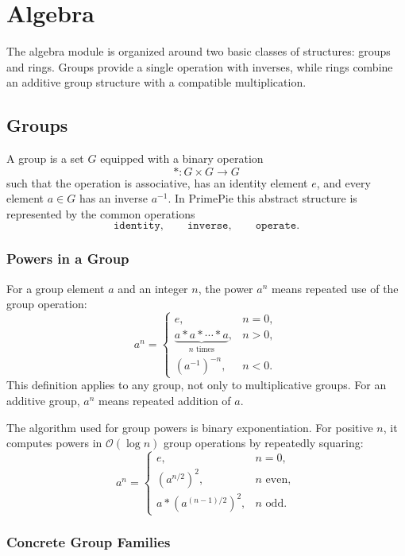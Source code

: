 \chapter{Algebra}
\label{sec:algebra}

The algebra module is organized around two basic classes of structures:
groups and rings. Groups provide a single operation with inverses, while rings
combine an additive group structure with a compatible multiplication.

\section{Groups}

A group is a set $G$ equipped with a binary operation
\[
  \ast : G \times G \to G
\]
such that the operation is associative, has an identity element $e$, and every
element $a \in G$ has an inverse $a^{-1}$. In PrimePie this abstract structure
is represented by the common operations
\[
  \texttt{identity}, \qquad
  \texttt{inverse}, \qquad
  \texttt{operate}.
\]

\subsection*{Powers in a Group}

For a group element $a$ and an integer $n$, the power $a^n$ means repeated use
of the group operation:
\[
a^n =
\begin{cases}
e, & n = 0,\\
\underbrace{a \ast a \ast \cdots \ast a}_{n \text{ times}}, & n > 0,\\
(a^{-1})^{-n}, & n < 0.
\end{cases}
\]
This definition applies to any group, not only to multiplicative groups. For an
additive group, $a^n$ means repeated addition of $a$.

The algorithm used for group powers is binary exponentiation. For positive
$n$, it computes powers in $\mathcal{O}(\log n)$ group operations by repeatedly
squaring:
\[
a^n =
\begin{cases}
e, & n = 0,\\
(a^{n/2})^2, & n \text{ even},\\
a \ast (a^{(n-1)/2})^2, & n \text{ odd}.
\end{cases}
\]

\subsection*{Concrete Group Families}

